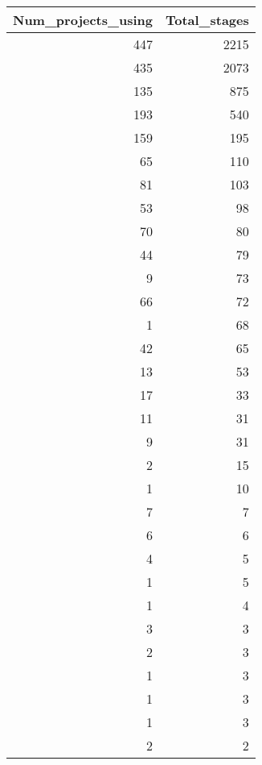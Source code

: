 \begin{tabular}{rr}
\toprule
 Num\_projects\_using &  Total\_stages \\
\midrule
                447 &          2215 \\
                435 &          2073 \\
                135 &           875 \\
                193 &           540 \\
                159 &           195 \\
                 65 &           110 \\
                 81 &           103 \\
                 53 &            98 \\
                 70 &            80 \\
                 44 &            79 \\
                  9 &            73 \\
                 66 &            72 \\
                  1 &            68 \\
                 42 &            65 \\
                 13 &            53 \\
                 17 &            33 \\
                 11 &            31 \\
                  9 &            31 \\
                  2 &            15 \\
                  1 &            10 \\
                  7 &             7 \\
                  6 &             6 \\
                  4 &             5 \\
                  1 &             5 \\
                  1 &             4 \\
                  3 &             3 \\
                  2 &             3 \\
                  1 &             3 \\
                  1 &             3 \\
                  1 &             3 \\
                  2 &             2 \\

\end{tabular}
